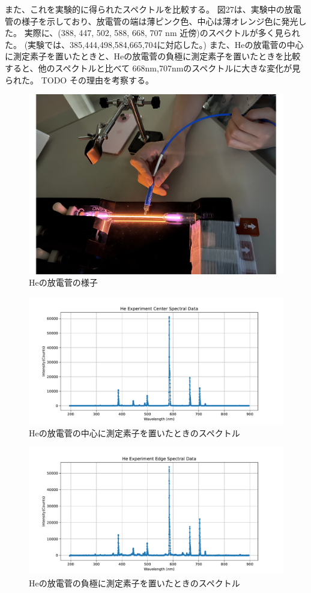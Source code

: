 \documentclass[a4j,twocolumn]{jsarticle}
\begin{document}
また、これを実験的に得られたスペクトルを比較する。
図27は、実験中の放電管の様子を示しており、放電管の端は薄ピンク色、中心は薄オレンジ色に発光した。
実際に、(388, 447, 502, 588, 668, 707 nm 近傍)のスペクトルが多く見られた。
(実験では、385,444,498,584,665,704に対応した。)
また、Heの放電菅の中心に測定素子を置いたときと、Heの放電菅の負極に測定素子を置いたときを比較すると、他のスペクトルと比べて
668nm,707nmのスペクトルに大きな変化が見られた。
TODO その理由を考察する。

\begin{figure}[htb]
    \centering
    \includegraphics[keepaspectratio,width=0.6\columnwidth]{fig/latexmkrc.pdf}
    \caption{Heの放電菅の様子}
\end{figure}
\begin{figure}[htb]
    \centering
    \includegraphics[keepaspectratio,width=0.6\columnwidth]{fig/He_center.pdf}
    \caption{Heの放電菅の中心に測定素子を置いたときのスペクトル}
\end{figure}
\begin{figure}[htb]
    \centering
    \includegraphics[keepaspectratio,width=0.6\columnwidth]{fig/He_edge.pdf}
    \caption{Heの放電菅の負極に測定素子を置いたときのスペクトル}
\end{figure}
\end{document}
